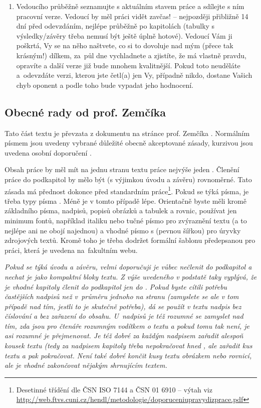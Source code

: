 \begin{enumerate}
	\item{Vedoucího průběžně seznamujte s aktuálním stavem práce a sdílejte s ním pracovní verze. Vedoucí by měl práci vidět zavčas! -- nejpozději přibližně 14 dní před odevzdáním, nejlépe průběžně po kapitolách (tabulky s výsledky/závěry třeba nemusí být ještě úplně hotové). Vedoucí Vám ji poškrtá, Vy se na něho naštvete, co si to dovoluje nad mým (přece tak krásným!) dílkem, za~půl dne vychladnete a zjistíte, že má vlastně pravdu, opravíte a další verze již bude mnohem kvalitnější. Pokud toto neuděláte a~odevzdáte verzi, kterou jste četl(a) jen Vy, případně nikdo, dostane  Vašich chyb oponent a podle toho bude vypadat jeho hodnocení.}
\end{enumerate}


\subsection*{Obecné rady od prof. Zemčíka}
Tato část textu je převzata z dokumentu na stránce prof. Zemčíka \cite{Zemcik}. Normálním písmem jsou uvedeny vybrané důležité obecně akceptované zásady, kurzivou jsou uvedena osobní doporučení .

Obsah práce by měl mít na jednu stranu textu práce nejvýše jeden . Členění práce do podkapitol by mělo být (s výjimkou úvodu a závěru) rovnoměrné. Tato zásada má přednost dokonce před standardním  práce\footnote{Desetinné třídění dle ČSN ISO 7144 a ČSN 01 6910 -- výtah viz \url{http://web.ftvs.cuni.cz/hendl/metodologie/doporuceniupravydizprace.pdf}}. Pokud se týká písma, je třeba typy písma . Méně je v tomto případě lépe. Orientačně byste měli kromě základního písma, nadpisů, popisů obrázků a tabulek a rovnic, používat jen minimum fontů, například italiku nebo tučné písmo pro zvýraznění textu (a to nejlépe ani ne obojí najednou) a vhodné písmo s  (pevnou šířkou) pro úryvky zdrojových textů. Kromě toho je třeba dodržet formální šablonu předepsanou pro práci, která je uvedena na~fakultním webu.

\it Pokud se týká úvodu a závěru, velmi doporučuji je vůbec nečlenit do podkapitol a nechat je jako kompaktní bloky textu. Z výše uvedeného v podstatě taky vyplývá, že je vhodné kapitoly členit do podkapitol jen do . Pokud byste cítili potřebu častějších nadpisů než v~průměru jednoho na
stranu (zamyslete se ale v tom případě nad tím, jestli to je skutečně potřeba), dá se použít v textu  nadpis bez číslování a bez zařazení do obsahu. U~nadpisů je též rozumné se zamyslet nad tím, zda jsou pro čtenáře rozumným vodítkem o textu a pokud tomu tak není, je asi rozumné je přejmenovat. Je též dobré za každým nadpisem zařadit alespoň kousek textu (tedy za nadpisem kapitoly třeba  nepokračovat hned , ale zařadit kus textu a pak pokračovat. Není také dobré končit kusy textu obrázkem nebo rovnicí, ale je vhodné zakončovat nějakým shrnujícím textem.

